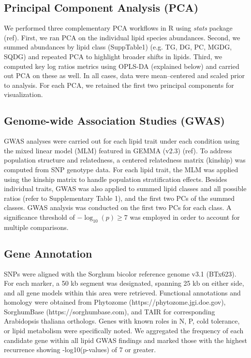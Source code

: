 \documentclass[10pt,letterpaper]{article}
\begin{document}
\begin{itemize}


\subsection*{Principal Component Analysis (PCA)}  
We performed three complementary PCA workflows in R using \emph{stats} package (ref).  First, we ran PCA on the individual lipid species abundances.  Second, we summed abundances by lipid class (SuppTable1) (e.g. TG, DG, PC, MGDG, SQDG) and repeated PCA to highlight broader shifts in lipids. Third, we computed key log ratios metrics using OPLS-DA (explained below) and carried out PCA on these as well. In all cases, data were mean–centered and scaled prior to analysis. For each PCA, we retained the first two principal components for visualization. 


\subsection*{Genome-wide Association Studies (GWAS)} 
GWAS analyses were carried out for each lipid trait under each condition using the mixed linear model (MLM) featured in GEMMA (v2.3) (ref). To address population structure and relatedness, a centered relatedness matrix (kinship) was computed from SNP genotype data. For each lipid trait, the MLM was applied using the kinship matrix to handle population stratification effects. Besides individual traits, GWAS was also applied to summed lipid classes and all possible ratios (refer to Supplementary Table 1), and the first two PCs of the summed classes. GWAS analysis was conducted on the first two PCs for each class. A significance threshold of \(-\log_{10}(p) \geq 7\) was employed in order to account for multiple comparisons. 

\subsection*{Gene Annotation}
SNPs were aligned with the Sorghum bicolor reference genome v3.1 (BTx623). For each marker, a 50 kb segment was designated, spanning 25 kb on either side, and all gene models within this area were retrieved. Functional annotations and homology were obtained from Phytozome (https://phytozome.jgi.doe.gov), SorghumBase (https://sorghumbase.com), and TAIR for corresponding Arabidopsis thaliana orthologs. Genes with known roles in N, P, cold tolerance, or lipid metabolism were specifically noted. We aggregated the frequency of each candidate gene within all lipid GWAS findings and marked those with the highest recurrence showing -log10(p-values) of 7 or greater.


\end{itemize}
\end{document}
